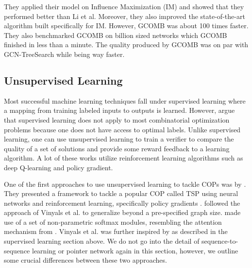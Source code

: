 \documentclass{article}
\begin{document}
They applied their model on Influence Maximization (IM) and showed that they performed better than Li et al. Moreover, they also improved the state-of-the-art algorithm built specifically for IM. However, GCOMB was about 100 times faster. They also benchmarked GCOMB on billion sized networks which GCOMB finished in less than a minute. The quality produced by GCOMB was on par with GCN-TreeSearch while being way faster.

\subsection{Unsupervised Learning}
Most successful machine learning techniques fall under supervised learning where a mapping from training labeled inputs to outputs is learned. However, \cite{bello2016neural} argue that supervised learning does not apply to most combinatorial optimization problems because one does not have access to optimal labels. Unlike supervised learning, one can use unsupervised learning to train a verifier to compare the quality of a set of solutions and provide some reward feedback to a learning algorithm. A lot of these works utilize reinforcement learning algorithms such as deep Q-learning and policy gradient. 

One of the first approaches to use unsupervised learning to tackle COPs was by \cite{bello2016neural}. They presented a framework to tackle a popular COP called TSP using neural networks and reinforcement learning, specifically policy gradients \cite{williams1992simple}. 
\cite{bello2016neural} followed the approach of Vinyals et al. to generalize beyond a pre-specified graph size. \cite{vinyals2015pointer} made use of a set of non-parametric softmax modules, resembling the attention mechanism from \cite{bahdanau2014neural}. Vinyals et al. was further inspired by \cite{sutskever2014sequence} as described in the supervised learning section above. We do not go into the detail of sequence-to-sequence learning or pointer network again in this section, however, we outline some crucial differences between these two approaches. 
\end{document}
